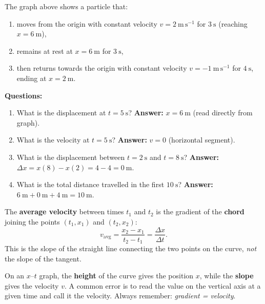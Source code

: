 \documentclass[11pt]{article}
\begin{document}
\begin{exemplebox}
The graph above shows a particle that:
\begin{enumerate}
\item moves from the origin with constant velocity $v=2\ \mathrm{m\,s^{-1}}$ for $3\ \mathrm{s}$ (reaching $x=6\ \mathrm{m}$),
\item remains at rest at $x=6\ \mathrm{m}$ for $3\ \mathrm{s}$,
\item then returns towards the origin with constant velocity $v=-1\ \mathrm{m\,s^{-1}}$ for $4\ \mathrm{s}$, ending at $x=2\ \mathrm{m}$.
\end{enumerate}
\textbf{Questions:}
\begin{enumerate}
\item What is the displacement at $t=5\ \mathrm{s}$? \quad \textbf{Answer:} $x=6\ \mathrm{m}$ (read directly from graph).
\item What is the velocity at $t=5\ \mathrm{s}$? \quad \textbf{Answer:} $v=0$ (horizontal segment).
\item What is the displacement between $t=2\ \mathrm{s}$ and $t=8\ \mathrm{s}$? \quad \textbf{Answer:} $\Delta x = x(8)-x(2) = 4 - 4 = 0\ \mathrm{m}$.
\item What is the total distance travelled in the first $10\ \mathrm{s}$? \quad \textbf{Answer:} $6\ \mathrm{m} + 0\ \mathrm{m} + 4\ \mathrm{m} = 10\ \mathrm{m}$.
\end{enumerate}
\end{exemplebox}

\begin{aretenir}
The \textbf{average velocity} between times $t_1$ and $t_2$ is the gradient of the \textbf{chord} joining the points $(t_1, x_1)$ and $(t_2, x_2)$:
\[
v_{\text{avg}} = \frac{x_2 - x_1}{t_2 - t_1} = \frac{\Delta x}{\Delta t}.
\]
This is the slope of the straight line connecting the two points on the curve, \emph{not} the slope of the tangent.
\end{aretenir}

\begin{attention}
On an $x$–$t$ graph, the \textbf{height} of the curve gives the position $x$, while the \textbf{slope} gives the velocity $v$. A common error is to read the value on the vertical axis at a given time and call it the velocity. Always remember: \emph{gradient = velocity}.
\end{attention}
\end{document}
